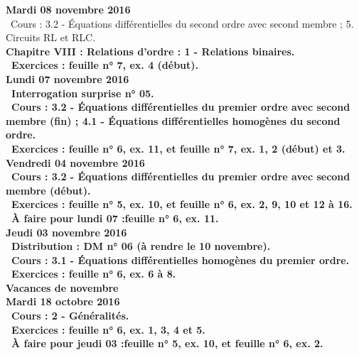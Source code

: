 \documentclass[12pt,a4paper]{article}
\begin{document}
\noindent\textbf{Mardi 08 novembre 2016}\\
\bu\ Cours : 3.2 - Équations différentielles du second ordre avec second membre ; 5. Circuits RL et RLC.\\
\bf Chapitre VIII \rm : Relations d'ordre : 1 - Relations binaires.\\
\bu\ Exercices : feuille n° 7, ex. 4 (début).\vspace{.4cm}\\

\noindent\textbf{Lundi 07 novembre 2016} \\
\bu\ Interrogation surprise n° 05.\\
\bu\ Cours : 3.2 - Équations différentielles du premier ordre avec second membre (fin) ; 4.1 - Équations 
différentielles homogènes du second ordre.\\
\bu\ Exercices : feuille n° 6, ex. 11, et feuille n° 7, ex. 1, 2 (début) et 3.\vspace{.4cm}\\

\noindent\textbf{Vendredi 04 novembre 2016}\\
\bu\ Cours : 3.2 - Équations différentielles du premier ordre avec 
second membre (début).\\
\bu\ Exercices : feuille n° 5, ex. 10, et feuille n° 6, ex. 2, 9, 10 et 12 à 16.\\
\bu\ À faire pour lundi 07 :feuille n° 6, ex. 11.\vspace{.4cm}\\

\noindent\textbf{Jeudi 03 novembre 2016}\\
\bu\ Distribution : DM n° 06 (à rendre le 10 novembre).\\
\bu\ Cours : 3.1 - Équations différentielles homogènes du premier ordre.\\
\bu\ Exercices : feuille n° 6, ex. 6 à 8.\vspace{.4cm}\\

\noindent\textbf{ Vacances de novembre }\vspace{.4cm}\\

\noindent\textbf{\bf Mardi 18 octobre 2016}\\
\bu\ Cours : 2 - Généralités.\\
\bu\ Exercices : feuille n° 6, ex. 1, 3, 4 et 5.\\
\bu\ À faire pour jeudi 03 :feuille n° 5, ex. 10, et feuille n° 6, ex. 2.\vspace{.4cm}\\
\end{document}
